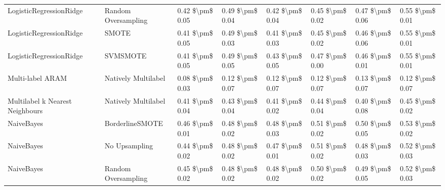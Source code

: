\begin{tabular}{llllllll}
        LogisticRegressionRidge &           Random Oversampling & 0.42 \$\textbackslash pm\$ 0.05 &           0.49 \$\textbackslash pm\$ 0.04 &       0.42 \$\textbackslash pm\$ 0.04 &        0.45 \$\textbackslash pm\$ 0.02 &                         0.47 \$\textbackslash pm\$ 0.06 &     0.55 \$\textbackslash pm\$ 0.01 \\
        LogisticRegressionRidge &                         SMOTE & 0.41 \$\textbackslash pm\$ 0.05 &           0.49 \$\textbackslash pm\$ 0.03 &       0.41 \$\textbackslash pm\$ 0.03 &        0.45 \$\textbackslash pm\$ 0.02 &                         0.46 \$\textbackslash pm\$ 0.06 &     0.55 \$\textbackslash pm\$ 0.01 \\
        LogisticRegressionRidge &                      SVMSMOTE & 0.41 \$\textbackslash pm\$ 0.05 &           0.49 \$\textbackslash pm\$ 0.05 &       0.43 \$\textbackslash pm\$ 0.05 &        0.47 \$\textbackslash pm\$ 0.00 &                         0.46 \$\textbackslash pm\$ 0.01 &     0.55 \$\textbackslash pm\$ 0.01 \\
               Multi-label ARAM &           Natively Multilabel & 0.08 \$\textbackslash pm\$ 0.03 &           0.12 \$\textbackslash pm\$ 0.07 &       0.12 \$\textbackslash pm\$ 0.07 &        0.12 \$\textbackslash pm\$ 0.07 &                         0.13 \$\textbackslash pm\$ 0.07 &     0.12 \$\textbackslash pm\$ 0.07 \\
Multilabel k Nearest Neighbours &           Natively Multilabel & 0.41 \$\textbackslash pm\$ 0.04 &           0.43 \$\textbackslash pm\$ 0.04 &       0.41 \$\textbackslash pm\$ 0.02 &        0.44 \$\textbackslash pm\$ 0.04 &                         0.40 \$\textbackslash pm\$ 0.08 &     0.45 \$\textbackslash pm\$ 0.02 \\
                     NaiveBayes &               BorderlineSMOTE & 0.46 \$\textbackslash pm\$ 0.01 &           0.48 \$\textbackslash pm\$ 0.02 &       0.48 \$\textbackslash pm\$ 0.03 &        0.51 \$\textbackslash pm\$ 0.02 &                         0.50 \$\textbackslash pm\$ 0.05 &     0.53 \$\textbackslash pm\$ 0.02 \\
                     NaiveBayes &                 No Upsampling & 0.44 \$\textbackslash pm\$ 0.02 &           0.48 \$\textbackslash pm\$ 0.02 &       0.47 \$\textbackslash pm\$ 0.01 &        0.51 \$\textbackslash pm\$ 0.02 &                         0.48 \$\textbackslash pm\$ 0.03 &     0.52 \$\textbackslash pm\$ 0.03 \\
                     NaiveBayes &           Random Oversampling & 0.45 \$\textbackslash pm\$ 0.02 &           0.48 \$\textbackslash pm\$ 0.02 &       0.48 \$\textbackslash pm\$ 0.02 &        0.50 \$\textbackslash pm\$ 0.02 &                         0.49 \$\textbackslash pm\$ 0.05 &     0.52 \$\textbackslash pm\$ 0.03 \\

\end{tabular}
